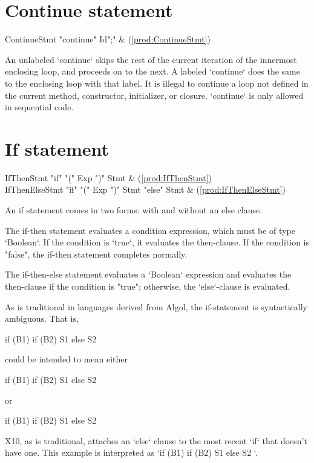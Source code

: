 \section{Continue statement}

\begin{bbgrammar}
        ContinueStmt \: \xcd"continue" Id\opt \xcd";" & (\ref{prod:ContinueStmt}) \\
\end{bbgrammar}
An unlabeled \xcd`continue` skips the rest of the current iteration of the
innermost enclosing loop, and proceeds on to the next.  A labeled
\xcd`continue` does the same to the enclosing loop with that label.
It is illegal to continue a loop not defined in the current
method, constructor, initializer, or closure.
\xcd`continue` is only allowed in sequential code.



\section{If statement}

\begin{bbgrammar}
          IfThenStmt \: \xcd"if" \xcd"(" Exp \xcd")" Stmt & (\ref{prod:IfThenStmt}) \\
      IfThenElseStmt \: \xcd"if" \xcd"(" Exp \xcd")" Stmt  \xcd"else" Stmt  & (\ref{prod:IfThenElseStmt}) \\
\end{bbgrammar}

An if statement comes in two forms: with and without an else
clause.

The if-then statement evaluates a condition expression, which must be of type
\xcd`Boolean`. If the condition is \xcd`true`, it evaluates the then-clause.
If the condition is \xcd"false", the if-then statement completes normally.

The if-then-else statement evaluates a \xcd`Boolean` expression and 
evaluates the then-clause if the condition is
\xcd"true"; otherwise, the \xcd`else`-clause is evaluated.

As is traditional in languages derived from Algol, the if-statement is syntactically
ambiguous.  That is, 
\begin{xten}
if (B1) if (B2) S1 else S2
\end{xten}
could be intended to mean either 
\begin{xten}
if (B1) { if (B2) S1 else S2 }
\end{xten} 
or 
\begin{xten}
if (B1) {if (B2) S1} else S2
\end{xten}
X10, as is traditional, attaches an \xcd`else` clause to the most recent
\xcd`if` that doesn't have one.
This example is interpreted as 
\xcd`if (B1) { if (B2) S1 else S2 }`. 



